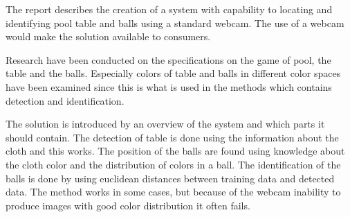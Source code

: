 The report describes the creation of a system with capability to locating and identifying pool table and balls using a standard webcam. The use of a webcam would make the solution available to consumers.

Research have been conducted on the specifications on the game of pool, the table and the balls. Especially colors of table and balls in different color spaces have been examined since this is what is used in the methods which contains detection and identification.

The solution is introduced by an overview of the system and which parts it should contain. The detection of table is done using the information about the cloth and this works. The position of the balls are found using knowledge about the cloth color and the distribution of colors in a ball. The identification of the balls is done by using euclidean distances between training data and detected data. The method works in some cases, but because of the webcam inability to produce images with good color distribution it often fails.

